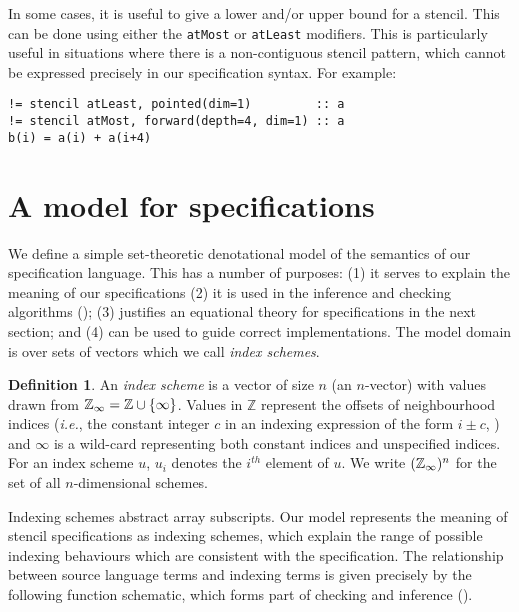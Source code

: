 \documentclass[10pt,preprint]{sigplanconf}
\newcounter{block}
\theoremstyle{definition}
\newtheorem{definition}[block]{Definition}
\newcommand{\ie}{\emph{i.e.}}
\newcommand{\term}[1]{\texttt{#1}}
\begin{document}
In some cases, it is useful to give a lower and/or upper bound for a
stencil. This can be done using either the \term{atMost} or
\term{atLeast} modifiers. This is particularly useful in situations
where there is a non-contiguous stencil pattern, which cannot be expressed
precisely in our specification syntax. For example:
%
\begin{verbatim}
!= stencil atLeast, pointed(dim=1)         :: a
!= stencil atMost, forward(depth=4, dim=1) :: a
b(i) = a(i) + a(i+4)
\end{verbatim}

\section{A model for specifications}
\label{sec:semantics}

We define a simple set-theoretic denotational model of the semantics
of our specification language. This has a number of purposes:
(1) it serves to explain the meaning of our specifications
(2) it is used in the inference and checking algorithms
(); (3) justifies an equational theory for
specifications in the next section; and (4) can be used to guide
correct implementations. The model domain is over sets of vectors
which we call \emph{index schemes}.

\begin{definition}
  An \emph{index scheme} is a vector of size $n$ (an $n$-vector) with
  values drawn from $\mathbb{Z}_\infty = \mathbb{Z} \cup \{\infty\}$.  Values
  in $\mathbb{Z}$ represent the offsets of neighbourhood indices
  (\ie{}, the constant integer $c$ in an indexing expression of the
  form $i \pm c$, ) and $\infty$ is a wild-card
  representing both constant indices and unspecified indices.
  For an index scheme $u$, $u_i$ denotes the $i^{th}$ element of $u$. We
  write $(\mathbb{Z}_\infty)^n$ for the set of all $n$-dimensional schemes.
\end{definition}

Indexing schemes abstract array subscripts.
Our model represents the meaning of stencil specifications
as indexing schemes, which explain the range of possible
indexing behaviours which are consistent with the specification.
The relationship between source language
terms and indexing terms
 is given precisely by the following function \textsf{schematic},
 which forms part of checking and inference ().
\end{document}
